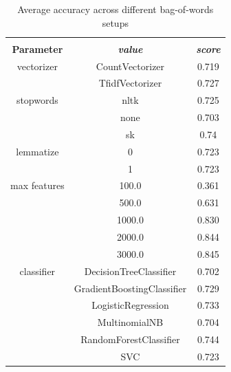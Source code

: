 \documentclass[conference]{IEEEtran}
\begin{document}
\begin{table}[htbp]
\caption{Average accuracy across different bag-of-words setups}
\begin{center}
\begin{tabular}{|c|c|c|}
\hline
\textbf{}&\multicolumn{2}{|c|}{\textbf{}} \\ 
\cline{2-3}
\textbf{Parameter} & \textbf{\textit{value}}& \textbf{\textit{score}} \\ 
\hline
vectorizer & CountVectorizer & 0.719 \\ 
\cline{2-3}
 & TfidfVectorizer & 0.727 \\ 
\hline
stopwords & nltk & 0.725 \\ 
\cline{2-3}
 & none & 0.703 \\ 
\cline{2-3}
 & sk & 0.74 \\ 
\hline
lemmatize & 0 & 0.723 \\ 
\cline{2-3}
 & 1 & 0.723 \\ 
\hline
max features & 100.0 & 0.361 \\ 
\cline{2-3}
 & 500.0 & 0.631 \\ 
\cline{2-3}
 & 1000.0 & 0.830 \\ 
\cline{2-3}
 & 2000.0 & 0.844 \\ 
\cline{2-3}
 & 3000.0 & 0.845 \\ 
\hline
classifier & DecisionTreeClassifier & 0.702 \\ 
\cline{2-3}
 & GradientBoostingClassifier & 0.729 \\ 
\cline{2-3}
 & LogisticRegression & 0.733 \\ 
\cline{2-3}
 & MultinomialNB & 0.704 \\ 
\cline{2-3}
 & RandomForestClassifier & 0.744 \\ 
\cline{2-3}
 & SVC & 0.723 \\ 
\hline
\end{tabular}
\label{taba5}
\end{center}
\end{table}
\end{document}
